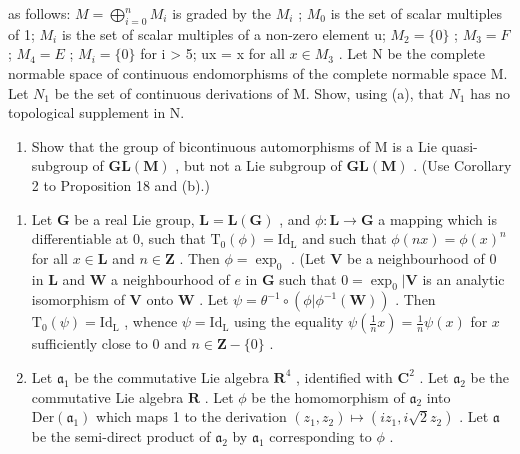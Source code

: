 as follows: \(M = \bigoplus_{i=0}^{n} M_{i}\) is graded by the \(M_{i}\) ; \(M_{0}\) is the set of scalar multiples of 1; \(M_{i}\) is the set of scalar multiples of a non-zero element u; \(M_{2} = \{0\}\) ; \(M_{3} = F\) ; \(M_{4} = E\) ; \(M_{i} = \{0\}\) for i \textgreater{} 5; ux = x for all \(x \in M_{3}\) . Let N be the complete normable space of continuous endomorphisms of the complete normable space M. Let \(N_{1}\) be the set of continuous derivations of M. Show, using (a), that \(N_{1}\) has no topological supplement in N.

\begin{enumerate}
\def\labelenumi{(\alph{enumi})}
\setcounter{enumi}{2}
\tightlist
\item
  Show that the group of bicontinuous automorphisms of M is a Lie quasi-subgroup of \(\mathbf{GL}(\mathbf{M})\) , but not a Lie subgroup of \(\mathbf{GL}(\mathbf{M})\) . (Use Corollary 2 to Proposition 18 and (b).)
\end{enumerate}

\begin{enumerate}
\def\labelenumi{\arabic{enumi}.}
\setcounter{enumi}{12}
\item
  Let \(\mathbf{G}\) be a real Lie group, \(\mathbf{L} = \mathbf{L}(\mathbf{G})\) , and \(\phi: \mathbf{L} \to \mathbf{G}\) a mapping which is differentiable at 0, such that \(\mathrm{T}_0(\phi) = \mathrm{Id}_{\mathrm{L}}\) and such that \(\phi(nx) = \phi(x)^n\) for all \(x \in \mathbf{L}\) and \(n \in \mathbf{Z}\) . Then \(\phi = \exp_0\) . (Let \(\mathbf{V}\) be a neighbourhood of 0 in \(\mathbf{L}\) and \(\mathbf{W}\) a neighbourhood of \(e\) in \(\mathbf{G}\) such that \(0 = \exp_0 | \mathbf{V}\) is an analytic isomorphism of \(\mathbf{V}\) onto \(\mathbf{W}\) . Let \(\psi = \theta^{-1} \circ (\phi | \phi^{-1}(\mathbf{W}))\) . Then \(\mathrm{T}_0(\psi) = \mathrm{Id}_{\mathrm{L}}\) , whence \(\psi = \mathrm{Id}_{\mathrm{L}}\) using the equality \(\psi\left(\frac{1}{n}x\right) = \frac{1}{n}\psi(x)\) for \(x\) sufficiently close to 0 and \(n \in \mathbf{Z} - \{0\}\) .
\item
  Let \(\mathfrak{a}_1\) be the commutative Lie algebra \(\mathbf{R}^4\) , identified with \(\mathbf{C}^2\) . Let \(\mathfrak{a}_2\) be the commutative Lie algebra \(\mathbf{R}\) . Let \(\phi\) be the homomorphism of \(\mathfrak{a}_2\) into \(\mathrm{Der}(\mathfrak{a}_1)\) which maps 1 to the derivation \((z_1, z_2) \mapsto (iz_1, i\sqrt{2}z_2)\) . Let \(\mathfrak{a}\) be the semi-direct product of \(\mathfrak{a}_2\) by \(\mathfrak{a}_1\) corresponding to \(\phi\) .
\end{enumerate}

